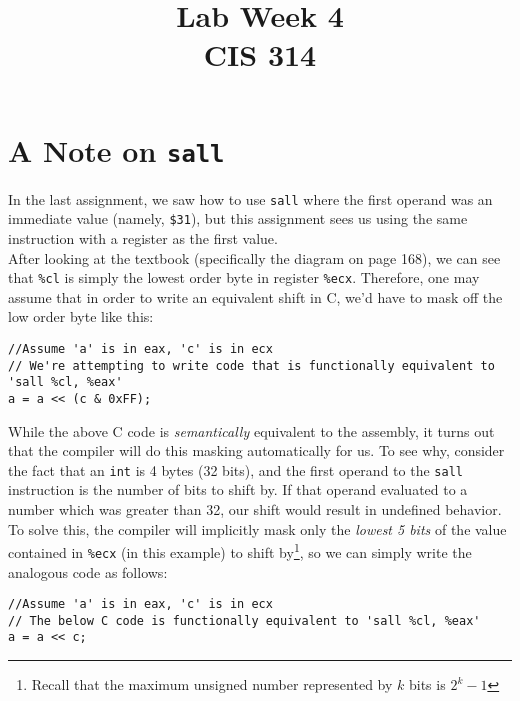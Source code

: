 \documentclass[10pt]{article}
\begin{document}
\title{Lab Week \raisebox{.22ex}{\large\#}4 \\
	CIS 314}
\author{}

\maketitle

\section{A Note on \texttt{sall}}

In the last assignment, we saw how to use \texttt{sall} where the first operand was an immediate value (namely, \texttt{\$31}), but this assignment sees us using the same instruction with a register as the first value.\\

\noindent After looking at the textbook (specifically the diagram on page 168), we can see that \texttt{\%cl} is simply the lowest order byte in register \texttt{\%ecx}. Therefore, one may assume that in order to write an equivalent shift in C, we'd have to mask off the low order byte like this:

\begin{lstlisting}
//Assume 'a' is in eax, 'c' is in ecx
// We're attempting to write code that is functionally equivalent to 'sall %cl, %eax'
a = a << (c & 0xFF);
\end{lstlisting}

\noindent While the above C code is \textit{semantically} equivalent to the assembly, it turns out that the compiler will do this masking automatically for us. To see why, consider the fact that an \texttt{int} is 4 bytes (32 bits), and the first operand to the \texttt{sall} instruction is the number of bits to shift by. If that operand evaluated to a number which was greater than 32, our shift would result in undefined behavior. To solve this, the compiler will implicitly mask only the \textit{lowest 5 bits} of the value contained in \texttt{\%ecx} (in this example) to shift by\footnote{Recall that the maximum unsigned number represented by $k$ bits is $2^k - 1$}, so we can simply write the analogous code as follows:

\begin{lstlisting}
//Assume 'a' is in eax, 'c' is in ecx
// The below C code is functionally equivalent to 'sall %cl, %eax'
a = a << c;
\end{lstlisting}
\end{document}
